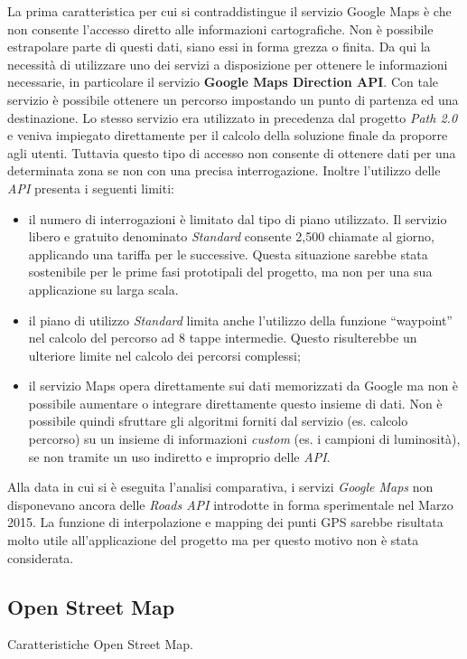 La prima caratteristica per cui si contraddistingue il servizio Google Maps è che non consente l'accesso diretto alle informazioni cartografiche. Non è possibile estrapolare parte di questi dati, siano essi in forma grezza o finita. Da qui la necessità di utilizzare uno dei servizi a disposizione per ottenere le informazioni necessarie, in particolare il servizio \textbf{Google Maps Direction API}. Con tale servizio è possibile ottenere un percorso impostando un punto di partenza ed una destinazione. Lo stesso servizio era utilizzato in precedenza dal progetto \emph{Path 2.0} e veniva impiegato direttamente per il calcolo della soluzione finale da proporre agli utenti. Tuttavia questo tipo di accesso non consente di ottenere dati per una determinata zona se non con una precisa interrogazione. Inoltre l'utilizzo delle \emph{API} presenta i seguenti limiti:
\begin{itemize}
\item il numero di interrogazioni è limitato dal tipo di piano utilizzato. Il servizio libero e gratuito denominato \emph{Standard} consente 2,500 chiamate al giorno, applicando una tariffa per le successive. Questa situazione sarebbe stata sostenibile per le prime fasi prototipali del progetto, ma non per una sua applicazione su larga scala.
\item il piano di utilizzo \emph{Standard} limita anche l'utilizzo della funzione ``waypoint'' nel calcolo del percorso ad 8 tappe intermedie. Questo risulterebbe un ulteriore limite nel calcolo dei percorsi complessi;
\item il servizio Maps opera direttamente sui dati memorizzati da Google ma non è possibile aumentare o integrare direttamente questo insieme di dati. Non è possibile quindi sfruttare gli algoritmi forniti dal servizio (es. calcolo percorso) su un insieme di informazioni \emph{custom} (es. i campioni di luminosità), se non tramite un uso indiretto e improprio delle \emph{API}.
\end{itemize}
Alla data in cui si è eseguita l'analisi comparativa, i servizi \emph{Google Maps} non disponevano ancora delle \emph{Roads API} introdotte in forma sperimentale nel Marzo 2015. La funzione di interpolazione e mapping dei punti GPS sarebbe risultata molto utile all'applicazione del progetto ma per questo motivo non è stata considerata.

\subsection{Open Street Map}
Caratteristiche Open Street Map.
